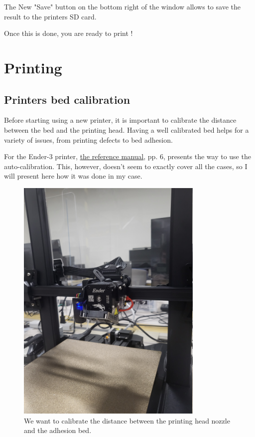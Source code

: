 \documentclass[a4paper,11pt]{article}
\begin{document}
The New "Save" button on the bottom right of the window allows to save the result to the printers
SD card.

Once this is done, you are ready to print !



\pagebreak
\section{Printing}
\label{sec:orge63f55d}

\subsection{Printers bed calibration}
\label{sec:org034d9ff}
Before starting using a new printer, it is important to calibrate the distance between the bed and the printing head.
Having a well calibrated bed helps for a variety of issues, from printing defects to bed adhesion.

For the Ender-3 printer, \href{https://img.staticdj.com/8f39f619af6bf34e5afb36ddbf2a0229.pdf?spm=..page\_1995605.download\_support\_1.1\&spm\_prev=..product\_5e45abfb-4541-4c92-ba93-cfba9a1e3ea4.nav\_link\_store\_1.1}{the reference manual}, pp. 6, presents the  way to use the auto-calibration.
This, however, doesn't seem to exactly cover all the cases, so I will present here how it was done in my case.

\begin{figure}[H]
    \centering 
    \includegraphics[width=0.8\textwidth]{img/ender/1.jpg} 
    \caption{We want to calibrate the distance between the printing head nozzle and the adhesion bed.}
    \label{fig:ender1}
\end{figure}
  
\end{document}
